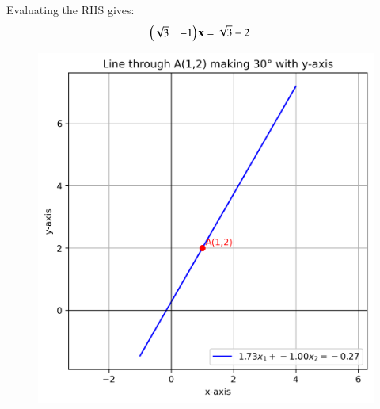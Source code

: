 \documentclass[journal]{IEEEtran}
\begin{document}
Evaluating the RHS gives:  
\begin{align}
\begin{pmatrix}\sqrt{3} & -1\end{pmatrix} \mathbf{x} &= \sqrt{3} - 2
\end{align}
\begin{figure}[H]
    \centering
    \includegraphics[width=0.5\columnwidth]{figs/fig1.png}
    \caption{}
    \label{fig:placeholder}
\end{figure}
\end{document}

